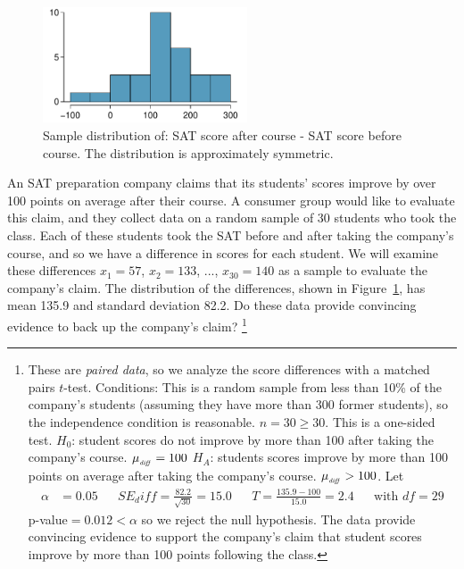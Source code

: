 \begin{figure}[h]
\centering
\includegraphics[width=0.54\textwidth]{ch_inference_for_means/figures/satImprovementHTDataHistogram/satImprovementHTDataHistogram}
\caption{Sample distribution of:  SAT score after course - SAT score before course. The distribution is approximately symmetric.}
\label{satImprovementHTDataHistogram}
\end{figure}

\textA{\newpage}

\begin{exercise}An SAT preparation company claims that its students' scores improve by over 100 points on average after their course. A consumer group would like to evaluate this claim, and they collect data on a random sample of 30 students who took the class. Each of these students took the SAT before and after taking the company's course, and so we have a difference in scores for each student. We will examine these differences $x_1=57$, $x_2=133$, ..., $x_{30}=140$ as a sample to evaluate the company's claim. The distribution of the differences, shown in Figure~\ref{satImprovementHTDataHistogram}, has mean 135.9 and standard deviation 82.2. Do these data provide convincing evidence to back up the company's claim?
\footnote{These are \emph{paired data}, so we analyze the score differences with a matched pairs $t$-test. Conditions: This is a random sample from less than 10\% of the company's students (assuming they have more than 300 former students), so the independence condition is reasonable. $n=30\ge 30$.
This is a one-sided test. $H_0$: student scores do not improve by more than 100 after taking the company's course. $\mu_{_{\text{\emph{diff}}}} = 100$  $H_A$: students scores improve by more than 100 points on average after taking the company's course. $\mu_{_{\text{\emph{diff}}}} > 100$.
Let
\begin{align*}
\alpha&=0.05
&&SE_diff = \frac{82.2}{\sqrt{30}} = 15.0
&&T = \frac{135.9-100}{15.0}=2.4
&&\text{with }df=29
\end{align*}
p-value$=0.012<\alpha$ so we reject the null hypothesis. The data provide convincing evidence to support the company's claim that student scores improve by more than 100 points following the class.}
\end{exercise}

